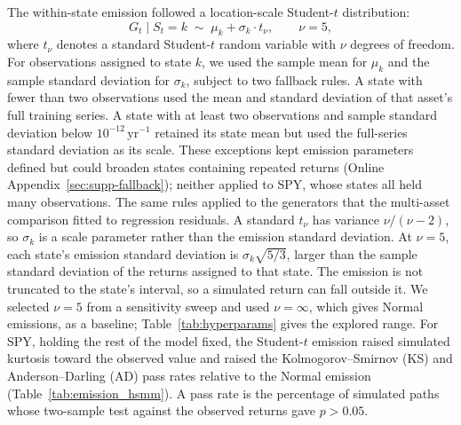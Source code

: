 The within-state emission followed a location-scale Student-$t$
distribution:
\begin{equation}
    G_t \mid S_t = k \;\sim\; \mu_k + \sigma_k \cdot t_{\nu},
    \qquad \nu = 5,
    \label{eq:emission}
\end{equation}
where $t_\nu$ denotes a standard Student-$t$ random variable with
$\nu$ degrees of freedom. For observations assigned to state $k$,
we used the sample mean for $\mu_k$ and the sample standard
deviation for $\sigma_k$, subject to two fallback rules. A state
with fewer than two observations used the mean and standard
deviation of that asset's full training series. A state with at
least two observations and sample standard deviation below $10^{-12}\,\mathrm{yr}^{-1}$
retained its state mean but used the full-series standard deviation
as its scale. These exceptions kept emission parameters defined but could broaden
states containing repeated returns (Online Appendix~\ref{sec:supp-fallback});
neither applied to SPY, whose states all held many observations. The same rules applied to the
generators that the multi-asset comparison fitted to regression
residuals. A standard $t_\nu$ has variance $\nu/(\nu-2)$, so
$\sigma_k$ is a scale parameter rather than the emission standard
deviation. At $\nu=5$, each state's emission standard deviation is
$\sigma_k\sqrt{5/3}$, larger than the sample standard deviation of
the returns assigned to that state. The emission is not truncated to
the state's interval, so a simulated return can fall outside it. We
selected $\nu = 5$ from a
sensitivity sweep and used $\nu = \infty$, which gives Normal
emissions, as a baseline; Table~\ref{tab:hyperparams} gives the
explored range. For SPY, holding the rest of the model fixed, the
Student-$t$ emission raised simulated kurtosis toward the observed value and
raised the Kolmogorov--Smirnov (KS) and Anderson--Darling (AD) pass
rates relative to the Normal emission (Table~\ref{tab:emission_hsmm}).
A pass rate is the percentage of simulated paths whose two-sample
test against the observed returns gave $p>0.05$.

